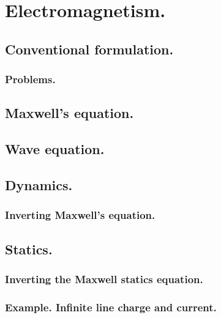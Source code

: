 %
%
   \chapter{Electromagnetism.}
      \section{Conventional formulation.}
         
         \subsection{Problems.}
            
      \section{Maxwell's equation.}
         
      \section{Wave equation.}
         
         
      \section{Dynamics.}
         \subsection{Inverting Maxwell's equation.}
            
      \section{Statics.}
         \subsection{Inverting the Maxwell statics equation.}
            
         \subsection{Example.  Infinite line charge and current.}
            
